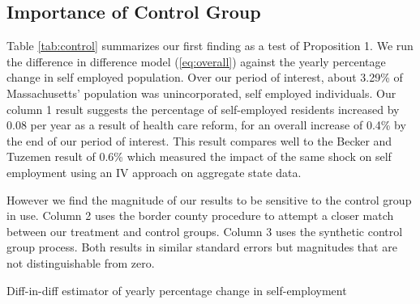 \documentclass[12pt]{article}
\begin{document}
\subsection{Importance of Control Group}

Table \ref{tab:control} summarizes our first finding as a test of Proposition 1. We run the difference in difference model (\ref{eq:overall}) against the yearly percentage change in self employed population. Over our period of interest, about 3.29\% of Massachusetts' population was unincorporated, self employed individuals. Our column 1 result suggests the percentage of self-employed residents increased by 0.08 per year as a result of health care reform, for an overall increase of 0.4\% by the end of our period of interest. This result compares well to the Becker and Tuzemen \citep{tuzemen2014self} result of 0.6\% which measured the impact of the same shock on self employment using an IV approach on aggregate state data. 

However we find the magnitude of our results to be sensitive to the control group in use. Column 2 uses the border county procedure to attempt a closer match between our treatment and control groups. Column 3 uses the synthetic control group process. Both results in similar standard errors but magnitudes that are not distinguishable from zero. 
\begin{center}
	\begin{table}[H]
		\centering
			\caption{Diff-in-diff estimator of yearly percentage change in self-employment} 
			
		\label{tab:control}
	\end{table}		
\end{center}
\begin{comment}
\multicolumn{4}{l}{\footnotesize Huber-White errors clustered at the county level in parentheses}\\
\multicolumn{4}{l}{\footnotesize * p<0.10, ** p<0.05, *** p<0.01}\\
\multicolumn{4}{l}{\footnotesize Diff-in-diff model of health care reform from 2000 to 2012 with Massachusetts treated after 2007. }\\
\multicolumn{4}{l}{\footnotesize Maine, Connecticut, Vermont, Rhode Island and New Hampshire used as controls in column (1). }\\
\multicolumn{4}{l}{\footnotesize Column (3) uses a synthetic control model that matches each Massachuetts county pre-trend against}\\
\multicolumn{4}{l}{\footnotesize \space US counties with similar income, age, urban and insurance rate characteristics. }\\
s. 
\end{comment}
\end{document}
